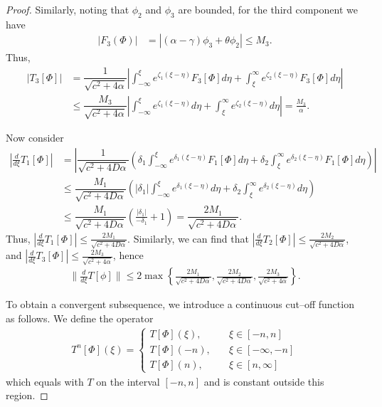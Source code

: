 \documentclass[11pt]{article}
\theoremstyle{definition}
\begin{document}
{\begin{proof}
Similarly, noting that $\phi_2$ and $\phi_3$ are bounded, for the third component we have \begin{align}|F_3(\Phi)|&= |(\alpha-\gamma)\phi_3+\theta\phi_2| \le  M_3.
    \end{align}
Thus, \begin{align}
    |T_3[\Phi]|&=\dfrac{1}{\sqrt{c^2+ 4  \alpha}}\left|\int_{- \infty}^{\xi}e^{\zeta_1(\xi-\eta)}F_3[\Phi] d \eta 
 + \int_{\xi}^{\infty }e^{\zeta_2(\xi-\eta)}F_3[\Phi] d \eta  \right|\\&  \le \dfrac{M_3}{\sqrt{c^2+ 4 \alpha}}\left|\int_{- \infty}^{\xi}e^{\zeta_1(\xi-\eta)} d \eta 
 + \int_{\xi}^{\infty }e^{\zeta_2(\xi-\eta)} d \eta  \right|=  \frac{M_3}{\alpha}.
\end{align}

Now consider 
\begin{align}
\left|\frac{d}{d \xi}T_1[\Phi]\right|&=\left|\dfrac{1}{\sqrt{c^2+ 4 D \alpha}}\left(\delta_1 \int_{- \infty}^{\xi}e^{\delta_1(\xi-\eta)}F_1[\Phi] d \eta 
 + \delta_2\int_{\xi}^{\infty }e^{\delta_2(\xi-\eta)}F_1[\Phi] d \eta \right) \right| \\ & \le \dfrac{M_1}{\sqrt{c^2+ 4 D \alpha}}\left(|\delta_1|\int_{- \infty}^{\xi}e^{\delta_1(\xi-\eta)} d \eta 
 + \delta_2\int_{\xi}^{\infty }e^{\delta_2(\xi-\eta)}  d \eta \right)  \\ & \le \dfrac{M_1}{\sqrt{c^2+ 4 D \alpha}} \left( \frac{|\delta_1|}{-\delta_1}+1\right)=  \dfrac{2M_1}{\sqrt{c^2+ 4 D \alpha}}.
\end{align}
Thus, $\left|\frac{d}{d \xi}T_1[\Phi]\right|\le \frac{2M_1}{\sqrt{c^2+ 4 D \alpha}}$. Similarly, we can find that $\left|\frac{d}{d \xi}T_2[\Phi]\right|\le \frac{2M_2}{\sqrt{c^2+ 4 D \alpha}}$, and $\left|\frac{d}{d \xi}T_3[\Phi]\right|\le \frac{2M_3}{\sqrt{c^2+ 4 \alpha}}$, hence
\begin{align}
    \|\frac{d}{d \xi}T[\phi]\|\le 2 \max \left\{\frac{2M_1}{\sqrt{c^2+ 4 D \alpha}}, \frac{2M_2}{\sqrt{c^2+ 4 D \alpha}}, \frac{2M_3}{\sqrt{c^2+ 4 \alpha}}\right\}.
\end{align}

To obtain a convergent subsequence, we introduce a continuous cut–off function as follows.  
We define the operator
 \begin{align}
    T^n [\Phi](\xi) =  \begin{cases}
       T[\Phi](\xi), & \quad \xi \in [-n,n] \\ 
       T[\Phi](-n), & \quad \xi \in [-\infty,-n] \\T[\Phi](n), & \quad \xi \in [n,\infty] 
    \end{cases}
\end{align}
    which equals with $T$ on the interval $[-n,n]$ and is constant outside this region.


\end{proof}}
\end{document}
